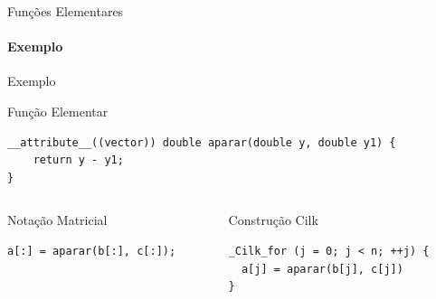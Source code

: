 \documentclass{beamer}
\begin{document}
\begin{frame}[fragile]{Funções Elementares}
\framesubtitle{Exemplo}
\begin{scriptsize}
\begin{block}{Exemplo}
\begin{block}{Função Elementar}
\begin{lstlisting}
__attribute__((vector)) double aparar(double y, double y1) {
    return y - y1;
}
\end{lstlisting}
\end{block}
\begin{columns}
\begin{column}{0.4\textwidth}
\begin{block}{Notação Matricial}
\begin{lstlisting}
a[:] = aparar(b[:], c[:]);
\end{lstlisting}
\end{block}

\end{column}
\begin{column}{0.4\textwidth}
\begin{block}{Construção Cilk}
\begin{lstlisting}
_Cilk_for (j = 0; j < n; ++j) {
  a[j] = aparar(b[j], c[j])
}
\end{lstlisting}
\end{block}
\end{column}
\end{columns}

\end{block}
\end{scriptsize}
\end{frame}
\end{document}
